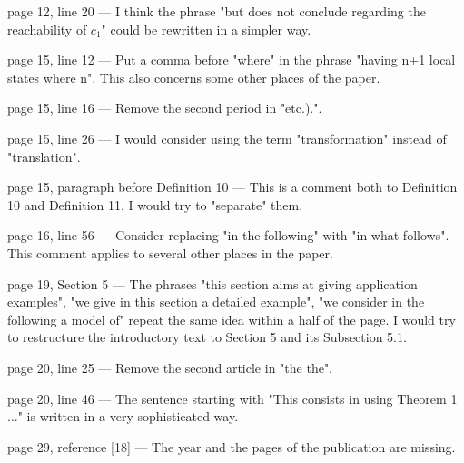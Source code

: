\documentclass[11pt]{article}
\begin{document}
page 12, line 20 ---
I think the phrase "but does not conclude regarding the reachability of $c_1$" could be rewritten in a simpler way.

page 15, line 12 ---
Put a comma before "where" in the phrase "having n+1 local states where n".
This also concerns some other places of the paper.

page 15, line 16 ---
Remove the second period in "etc.).".

page 15, line 26 ---
I would consider using the term "transformation" instead of "translation".

page 15, paragraph before Definition 10 ---
This is a comment both to Definition 10 and Definition 11. I would try to "separate" them.

page 16, line 56 ---
Consider replacing "in the following" with "in what follows".
This comment applies to several other places in the paper.

page 19, Section 5 ---
The phrases "this section aims at giving application examples", "we give in this section a detailed example", "we consider in the following a model of" repeat the same idea within a half of the page. I would try to restructure the introductory text to Section 5 and its Subsection 5.1.

page 20, line 25 ---
Remove the second article in "the the".

page 20, line 46 ---
The sentence starting with "This consists in using Theorem 1 ..." is written in a very sophisticated way.

page 29, reference [18] ---
The year and the pages of the publication are missing.


\end{document}
